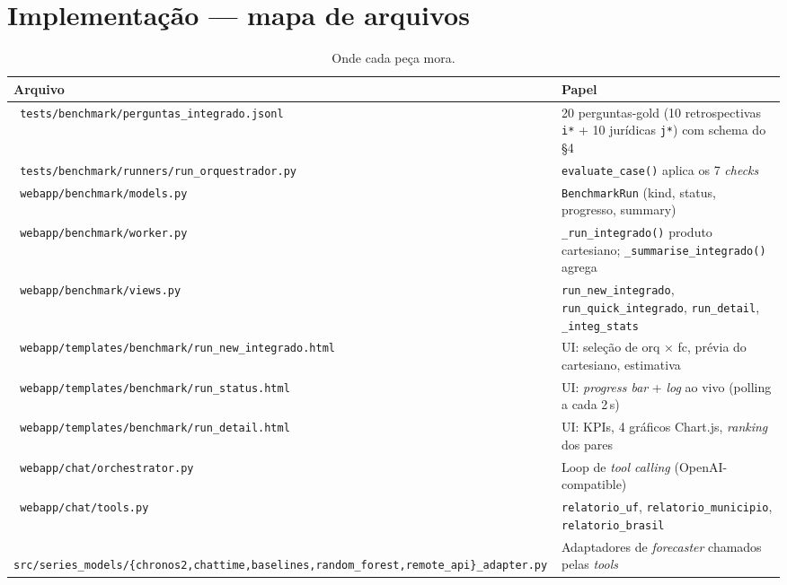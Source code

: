 \documentclass[11pt,a4paper]{article}
\newcommand{\code}[1]{\texttt{\small #1}}
\newcommand{\file}[1]{\texttt{\small\color{black!75} #1}}
\begin{document}
\section{Implementação --- mapa de arquivos}

\begin{table}[h!]
\centering
\small
\renewcommand{\arraystretch}{1.15}
\begin{tabularx}{\textwidth}{@{}l X@{}}
\toprule
\textbf{Arquivo} & \textbf{Papel} \\
\midrule
\file{tests/benchmark/perguntas\_integrado.jsonl} & 20 perguntas-gold (10 retrospectivas \code{i*} + 10 jurídicas \code{j*}) com schema do §4 \\
\file{tests/benchmark/runners/run\_orquestrador.py} & \code{evaluate\_case()} aplica os 7 \emph{checks} \\
\file{webapp/benchmark/models.py} & \code{BenchmarkRun} (kind, status, progresso, summary) \\
\file{webapp/benchmark/worker.py} & \code{\_run\_integrado()} produto cartesiano; \code{\_summarise\_integrado()} agrega \\
\file{webapp/benchmark/views.py} & \code{run\_new\_integrado}, \code{run\_quick\_integrado}, \code{run\_detail}, \code{\_integ\_stats} \\
\file{webapp/templates/benchmark/run\_new\_integrado.html} & UI: seleção de orq × fc, prévia do cartesiano, estimativa \\
\file{webapp/templates/benchmark/run\_status.html} & UI: \emph{progress bar} + \emph{log} ao vivo (polling a cada 2\,s) \\
\file{webapp/templates/benchmark/run\_detail.html} & UI: KPIs, 4 gráficos Chart.js, \emph{ranking} dos pares \\
\file{webapp/chat/orchestrator.py} & Loop de \emph{tool calling} (OpenAI-compatible) \\
\file{webapp/chat/tools.py} & \code{relatorio\_uf}, \code{relatorio\_municipio}, \code{relatorio\_brasil} \\
\file{src/series_models/\{chronos2,chattime,baselines,random\_forest,remote\_api\}\_adapter.py} &
  Adaptadores de \emph{forecaster} chamados pelas \emph{tools} \\
\bottomrule
\end{tabularx}
\caption{Onde cada peça mora.}
\end{table}

\end{document}
